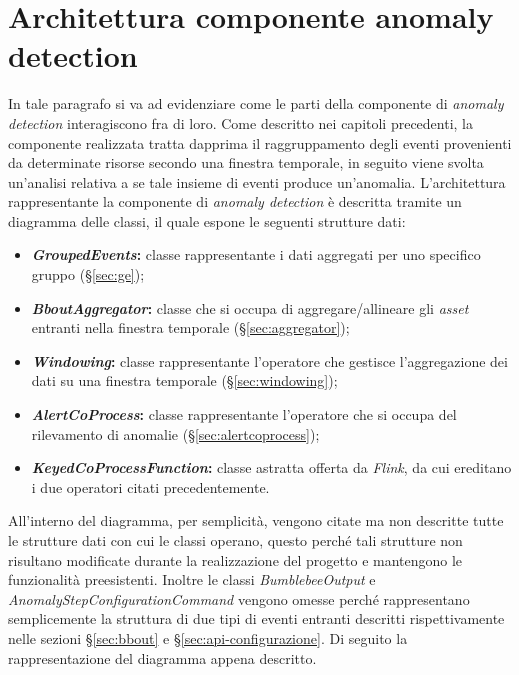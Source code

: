 

\section{Architettura componente anomaly detection}
In tale paragrafo si va ad evidenziare come le parti della componente di \textit{anomaly detection} interagiscono fra di loro. Come descritto nei capitoli precedenti, la componente realizzata tratta dapprima il raggruppamento degli eventi provenienti da determinate risorse secondo una finestra temporale, in seguito viene svolta un'analisi relativa a se tale insieme di eventi produce un'anomalia.
L'architettura rappresentante la componente di \textit{anomaly detection} è descritta tramite un \gls{diagramma delle classi}, il quale espone le seguenti strutture dati:
\begin{itemize}
	\item{\textbf{\textit{GroupedEvents}:} classe rappresentante i dati aggregati per uno specifico gruppo (\S\ref{sec:ge});}
	\item{\textbf{\textit{BboutAggregator}:} classe che si occupa di aggregare/allineare gli \textit{asset} entranti nella finestra temporale (\S\ref{sec:aggregator});}
	\item{\textbf{\textit{Windowing}:} classe rappresentante l'operatore che gestisce l'aggregazione dei dati su una finestra temporale (\S\ref{sec:windowing});}
	\item{\textbf{\textit{AlertCoProcess}:} classe rappresentante l'operatore che si occupa del rilevamento di anomalie (\S\ref{sec:alertcoprocess});}
	\item{\textbf{\textit{KeyedCoProcessFunction}:} classe astratta offerta da \textit{Flink}, da cui ereditano i due operatori citati precedentemente.}
\end{itemize}
All'interno del diagramma, per semplicità, vengono citate ma non descritte tutte le strutture dati con cui le classi operano, questo perché tali strutture non risultano modificate durante la realizzazione del progetto e mantengono le funzionalità preesistenti. Inoltre le classi \textit{BumblebeeOutput} e \textit{AnomalyStepConfigurationCommand} vengono omesse perché rappresentano semplicemente la struttura di due tipi di eventi entranti descritti rispettivamente nelle sezioni \S\ref{sec:bbout} e \S\ref{sec:api-configurazione}.
Di seguito la rappresentazione del diagramma appena descritto.

